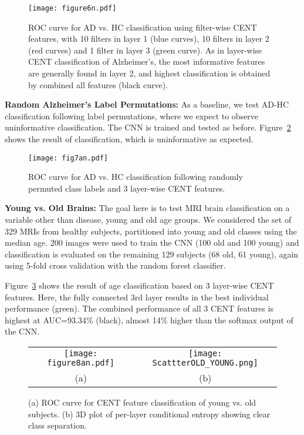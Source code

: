 \documentclass[10pt,onecolumn]{article}
\begin{document}
\begin{figure}[t]
\begin{center}
\texttt{[image: figure6n.pdf]}
\end{center}
   \caption{ROC curve for AD vs. HC classification using filter-wise CENT features, with 10 filters in layer 1 (blue curves), 10 filters in layer 2 (red curves) and 1 filter in layer 3 (green curve). As in layer-wise CENT classification of Alzheimer's, the most informative features are generally found in layer 2, and highest classification is obtained by combined all features (black curve).}
\label{fig:ad_cent_featurewise}
\end{figure}

{\bf Random Alzheimer's Label Permutations:} As a baseline, we test AD-HC classification following label permutations, where we expect to observe uninformative classification. The CNN is trained and tested as before. Figure~\ref{fig:permutation_cent_layerwise} shows the result of classification, which is uninformative as expected.

\begin{figure}[t]
\begin{center}
\texttt{[image: fig7an.pdf]}
\end{center}
   \caption{ROC curve for AD vs. HC classification following randomly permuted class labels and 3 layer-wise CENT features.}
\label{fig:permutation_cent_layerwise}
\end{figure}

{\bf Young vs. Old Brains:} The goal here is to test MRI brain classification on a variable other than disease, young and old age groups. We considered the set of 329 MRIs from healthy subjects, partitioned into young and old classes using the median age. 200 images were used to train the CNN (100 old and 100 young) and classification is evaluated on the remaining 129 subjects (68 old, 61 young), again using 5-fold cross validation with the random forest classifier.

Figure~\ref{fig:age_cent_layerwise} shows the result of age classification based on 3 layer-wise CENT features. Here, the fully connected 3rd layer results in the best individual performance (green). The combined performance of all 3 CENT features is highest at AUC=93.34\% (black), almost 14\% higher than the softmax output of the CNN.
\begin{figure}[t]
\begin{center}
\begin{tabular}{cc}
\texttt{[image: figure8an.pdf]} &
\vspace{0.5cm}
\texttt{[image: ScattterOLD\_YOUNG.png]} \\
(a) & (b) \\
\end{tabular}
\end{center}
   \caption{(a) ROC curve for CENT feature classification of young vs. old subjects. (b) 3D plot of per-layer conditional entropy showing clear class separation.}
\label{fig:age_cent_layerwise}
\end{figure}
\end{document}
